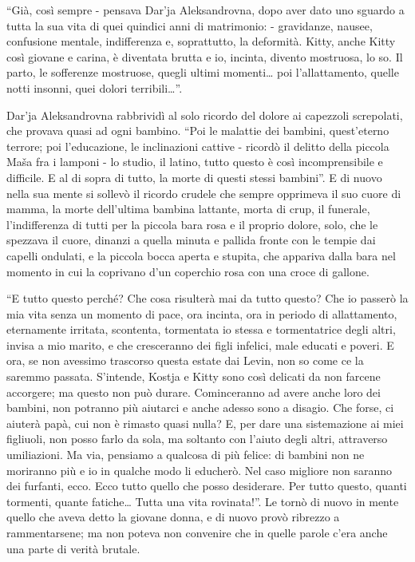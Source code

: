 ``Già, così sempre - pensava Dar'ja Aleksandrovna, dopo aver dato uno sguardo a tutta la sua vita di quei quindici anni di matrimonio: - gravidanze, nausee, confusione mentale, indifferenza e, soprattutto, la deformità. Kitty, anche Kitty così giovane e carina, è diventata brutta e io, incinta, divento mostruosa, lo so. Il parto, le sofferenze mostruose, quegli ultimi momenti\ldots{} poi l'allattamento, quelle notti insonni, quei dolori terribili\ldots{}''. 

Dar'ja Aleksandrovna rabbrividì al solo ricordo del dolore ai capezzoli screpolati, che provava quasi ad ogni bambino. ``Poi le malattie dei bambini, quest'eterno terrore; poi l'educazione, le inclinazioni cattive - ricordò il delitto della piccola Maša fra i lamponi - lo studio, il latino, tutto questo è così incomprensibile e difficile. E al di sopra di tutto, la morte di questi stessi bambini''. E di nuovo nella sua mente si sollevò il ricordo crudele che sempre opprimeva il suo cuore di mamma, la morte dell'ultima bambina lattante, morta di crup, il funerale, l'indifferenza di tutti per la piccola bara rosa e il proprio dolore, solo, che le spezzava il cuore, dinanzi a quella minuta e pallida fronte con le tempie dai capelli ondulati, e la piccola bocca aperta e stupita, che appariva dalla bara nel momento in cui la coprivano d'un coperchio rosa con una croce di gallone. 
\enlargethispage*{1\baselineskip}

``E tutto questo perché? Che cosa risulterà mai da tutto questo? Che io passerò la mia vita senza un momento di pace, ora incinta, ora in periodo di allattamento, eternamente irritata, scontenta, tormentata io stessa e tormentatrice degli altri, invisa a mio marito, e che cresceranno dei figli infelici, male educati e poveri. E ora, se non avessimo trascorso questa estate dai Levin, non so come ce la saremmo passata. S'intende, Kostja e Kitty sono così delicati da non farcene accorgere; ma questo non può durare. Cominceranno ad avere anche loro dei bambini, non potranno più aiutarci e anche adesso sono a disagio. Che forse, ci aiuterà papà, cui non è rimasto quasi nulla? E, per dare una sistemazione ai miei figliuoli, non posso farlo da sola, ma soltanto con l'aiuto degli altri, attraverso umiliazioni. Ma via, pensiamo a qualcosa di più felice: di bambini non ne moriranno più e io in qualche modo li educherò. Nel caso migliore non saranno dei furfanti, ecco. Ecco tutto quello che posso desiderare. Per tutto questo, quanti tormenti, quante fatiche\ldots{} Tutta una vita rovinata!''. Le tornò di nuovo in mente quello che aveva detto la giovane donna, e di nuovo provò ribrezzo a rammentarsene; ma non poteva non convenire che in quelle parole c'era anche una parte di verità brutale. 

